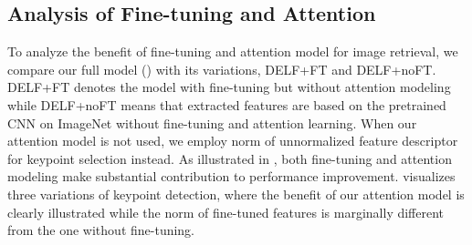 \documentclass[10pt,twocolumn,letterpaper]{article}
\begin{document}
\subsection{Analysis of Fine-tuning and Attention}
\label{sub:annalysis}
To analyze the benefit of fine-tuning and attention model for image retrieval, we compare our full model () with its variations, DELF+FT and DELF+noFT.
DELF+FT denotes the model with fine-tuning but without attention modeling while DELF+noFT means that extracted features are based on the pretrained CNN on ImageNet without fine-tuning and attention learning.
When our attention model is not used, we employ  norm of unnormalized feature descriptor for keypoint selection instead.
As illustrated in , both fine-tuning and attention modeling make substantial contribution to performance improvement.
 visualizes three variations of keypoint detection, where the benefit of our attention model is clearly illustrated while the  norm of fine-tuned features is marginally different from the one without fine-tuning.
\fi

\iffalse
\figref{fig:vis_att} presents a visualization of the different keypoint selection methods, for some images.
Qualitatively, it shows that the  norm scores benefit from fine-tuning; scores for image regions without landmarks (\eg, faces, people) are suppressed, and scores for regions containing landmarks are boosted.
A substantial difference can be observed between attention and  scores; the attention portion of the network produces high scores for landmark regions while significantly suppressing clutter which is irrelevant for the landmark recognition task.
\fi
\end{document}
